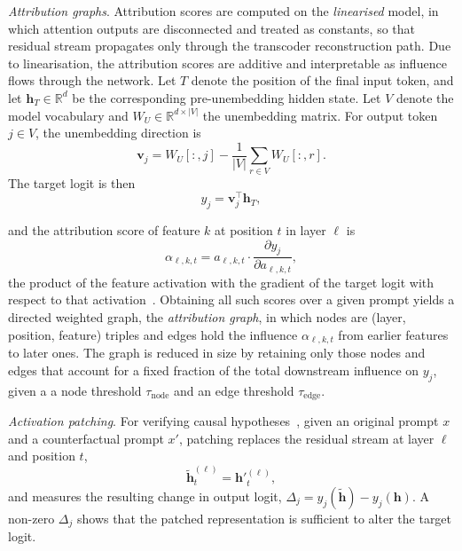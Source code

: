 \vspace{3 mm}
\textit{Attribution graphs}. Attribution scores are computed on the \textit{linearised} model, in which attention outputs
are disconnected and treated as constants, so that residual stream propagates only through the
transcoder reconstruction path.  Due to linearisation, the attribution scores
are additive and interpretable as influence flows through the network.  Let \(T\) denote the position of the final input token, and let
\(\mathbf{h}_T \in \mathbb{R}^d\) be the corresponding pre-unembedding hidden
state. Let \(V\) denote the model vocabulary and
\(W_U \in \mathbb{R}^{d \times |V|}\) the unembedding matrix. For output token
\(j \in V\), the unembedding direction is
\begin{equation}
    \mathbf{v}_j
    =
    W_U[:,j]
    -
    \frac{1}{|V|}\sum_{r \in V} W_U[:,r].
    \label{eq:demeaned-unembedding}
\end{equation}
The target logit is then
\begin{equation}
    y_j = \mathbf{v}_j^\top \mathbf{h}_T ,
    \label{eq:target-logit}
\end{equation}


and the attribution score
of feature $k$ at position $t$ in layer $\ell$ is
\begin{equation}
    \alpha_{\ell,k,t}
      = a_{\ell,k,t}
        \cdot \frac{\partial y_j}{\partial a_{\ell,k,t}},
    \label{eq:attribution}
\end{equation}
the product of the feature activation with the gradient of the target logit with respect to
that activation~\citep{lindsey2025biology}.  Obtaining all such scores over a given prompt
yields a directed weighted graph, the \textit{attribution graph}, in which nodes are
(layer, position, feature) triples and edges hold the influence $\alpha_{\ell,k,t}$ from
earlier features to later ones.  The graph is reduced in size by retaining only those nodes and edges that account for a fixed fraction of the total downstream influence on $y_j$, given a
a node threshold $\tau_\mathrm{node}$ and an edge threshold $\tau_\mathrm{edge}$.

\textit{Activation patching}. For verifying causal hypotheses~\citep{meng2022locating, conmy2023automated}, given an original prompt
$x$ and a counterfactual prompt $x'$, patching replaces the residual stream at layer $\ell$
and position $t$,
\begin{equation}
    \tilde{\mathbf{h}}^{(\ell)}_t = \mathbf{h}'^{(\ell)}_t,
    \label{eq:patching}
\end{equation}
and measures the resulting change in output logit,
$\Delta_j = y_j(\tilde{\mathbf{h}}) - y_j(\mathbf{h})$.  A non-zero $\Delta_j$ shows
that the patched representation is sufficient to alter the target logit. 


